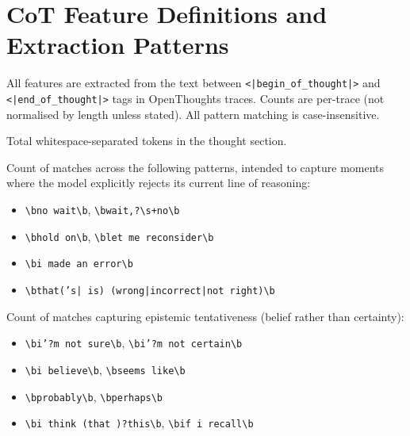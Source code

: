 \documentclass{article} %
\begin{document}
\section{CoT Feature Definitions and Extraction Patterns}
\label{app:cot_defs}

All features are extracted from the text between \texttt{<|begin\_of\_thought|>} and \texttt{<|end\_of\_thought|>} tags in OpenThoughts traces. Counts are per-trace (not normalised by length unless stated). All pattern matching is case-insensitive.

\begin{description}[leftmargin=1.5em, labelindent=0pt]

\item[\textbf{Word count.}] Total whitespace-separated tokens in the thought section.

\item[\textbf{Uncertainty markers.}] Count of matches across the following patterns, intended to capture moments where the model explicitly rejects its current line of reasoning:
\begin{itemize}[noitemsep]
  \item \texttt{\textbackslash bno wait\textbackslash b}, \quad \texttt{\textbackslash bwait,?\textbackslash s+no\textbackslash b}
  \item \texttt{\textbackslash bhold on\textbackslash b}, \quad \texttt{\textbackslash blet me reconsider\textbackslash b}
  \item \texttt{\textbackslash bi made an error\textbackslash b}
  \item \texttt{\textbackslash bthat('s| is) (wrong|incorrect|not right)\textbackslash b}
\end{itemize}

\item[\textbf{Hedging.}] Count of matches capturing epistemic tentativeness (belief rather than certainty):
\begin{itemize}[noitemsep]
  \item \texttt{\textbackslash bi'?m not sure\textbackslash b}, \quad \texttt{\textbackslash bi'?m not certain\textbackslash b}
  \item \texttt{\textbackslash bi believe\textbackslash b}, \quad \texttt{\textbackslash bseems like\textbackslash b}
  \item \texttt{\textbackslash bprobably\textbackslash b}, \quad \texttt{\textbackslash bperhaps\textbackslash b}
  \item \texttt{\textbackslash bi think (that )?this\textbackslash b}, \quad \texttt{\textbackslash bif i recall\textbackslash b}
\end{itemize}


\end{description}
\end{document}
